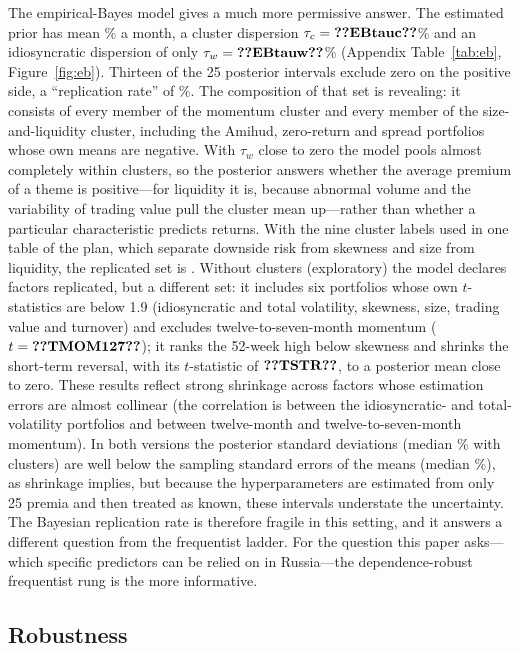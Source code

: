 \documentclass[11pt]{article}
\begin{document}
The empirical-Bayes model gives a much more permissive answer. The estimated prior has mean \% a month,
a cluster dispersion $\tau_c=\val{EBtauc}$\% and an idiosyncratic dispersion of only $\tau_w=\val{EBtauw}$\%
(Appendix Table~\ref{tab:eb}, Figure~\ref{fig:eb}). Thirteen of the 25 posterior intervals exclude zero on the positive
side, a ``replication rate'' of \%. The composition of that set is revealing: it consists of every member of
the momentum cluster and every member of the size-and-liquidity cluster, including the Amihud, zero-return and spread
portfolios whose own means are negative. With $\tau_w$ close to zero the model pools almost completely within clusters,
so the posterior answers whether the average premium of a theme is positive---for liquidity it is, because abnormal
volume and the variability of trading value pull the cluster mean up---rather than whether a particular characteristic
predicts returns. With the nine cluster labels used in one table of the plan, which separate downside risk from
skewness and size from liquidity, the replicated set is . Without clusters (exploratory) the model
declares  factors replicated, but a different set: it includes six portfolios whose own $t$-statistics are
below 1.9 (idiosyncratic and total volatility, skewness, size, trading value and turnover) and excludes
twelve-to-seven-month momentum ($t=\val{TMOM127}$); it ranks the 52-week high below skewness and shrinks the short-term
reversal, with its $t$-statistic of $\val{TSTR}$, to a posterior mean close to zero. These results reflect strong
shrinkage across factors whose estimation errors are almost collinear (the correlation is  between the
idiosyncratic- and total-volatility portfolios and  between twelve-month and twelve-to-seven-month
momentum). In both versions the posterior standard deviations (median \% with clusters) are well below
the sampling standard errors of the means (median \%), as shrinkage implies, but because the
hyperparameters are estimated from only 25 premia and then treated as known, these intervals understate the
uncertainty. The Bayesian replication rate is therefore fragile in this setting, and it answers a different
question from the frequentist ladder. For the question this paper asks---which specific predictors can be relied on in
Russia---the dependence-robust frequentist rung is the more informative.

\subsection{Robustness}\label{sec:robust}
\end{document}
